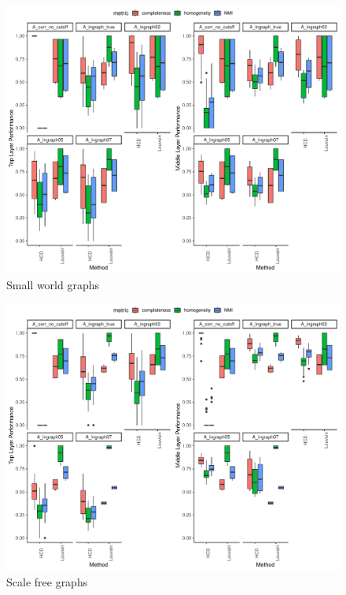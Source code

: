 \documentclass[
]{article}
\begin{document}
\begin{figure}
\centering
\includegraphics{Lab_report_3_13_2024_files/figure-latex/unnamed-chunk-2-1.pdf}
\caption{Small world graphs}
\end{figure}

\begin{figure}
\centering
\includegraphics{Lab_report_3_13_2024_files/figure-latex/unnamed-chunk-3-1.pdf}
\caption{Scale free graphs}
\end{figure}
\end{document}
